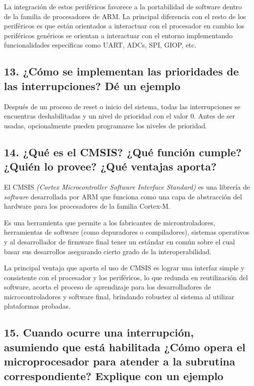 \documentclass[10pt,a4paper,twoside,spanish]{article}	%
\begin{document}
La integración de estos periféricos favorece a la portabilidad de software dentro de la familia de procesadores de ARM. La principal diferencia con el resto de los periféricos es que están orientados a interactuar con el procesador en cambio los periféricos genéricos se orientan a interactuar con el entorno implementando funcionalidades específicas como UART, ADCs, SPI, GIOP, etc.



\subsection*{13. ¿Cómo se implementan las prioridades de las interrupciones? Dé un ejemplo}

Después de un proceso de reset o inicio del sistema, todas las interrupciones se encuentras deshabilitadas y un nivel de prioridad con el valor 0. Antes de ser usadas, opcionalmente pueden programarse los niveles de prioridad.


\subsection*{14. ¿Qué es el CMSIS? ¿Qué función cumple? ¿Quién lo provee? ¿Qué ventajas aporta?}

El CMSIS \textit{(Cortex Microcontroller Software Interface Standard)} es una librería de \textit{software} desarrollada por ARM que funciona como  una capa de abstracción del hardware para los procesadores de la familia Cortex-M.

Es una herramienta que permite a los fabricantes de microntroladores, herramientas de software (como depuradores o compiladores), sistemas operativos y al desarrollador de firmware final tener un estándar en común sobre el cual basar sus desarrollos asegurando cierto grado de la interoperabilidad.

La principal ventaja que aporta el uso de CMSIS es lograr una interfaz simple y consistente con el procesador y los periféricos, lo que redunda en  reutilización del software, acorta el proceso de aprendizaje para los desarrolladores de microcontroladores y software final, brindando robustez al sistema al utilizar plataformas probadas. 

\subsection*{15. Cuando ocurre una interrupción, asumiendo que está habilitada ¿Cómo opera el microprocesador para atender a la subrutina correspondiente? Explique con un ejemplo}
\end{document}
